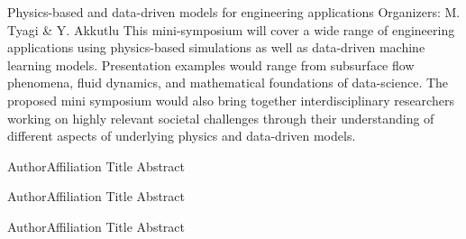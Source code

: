 \label{mini06}

\miniabs
{Physics-based and data-driven models for engineering applications}
{Organizers: M. Tyagi \& Y. Akkutlu}
{This mini-symposium will cover a wide range of engineering applications using physics-based simulations as well as data-driven machine learning models. Presentation examples would range from subsurface flow phenomena, fluid dynamics, and mathematical foundations of data-science. The proposed mini symposium would also bring together interdisciplinary researchers working on highly relevant societal challenges through their understanding of different aspects of underlying physics and data-driven models.}
\vspace{2ex}


\begin{addmargin}[2em]{0em}

\abs
{Author}{Affiliation}
{Title}
{Abstract
}

\vspace{1.5ex}

\abs
{Author}{Affiliation}
{Title}
{Abstract
}

\vspace{1.5ex}

\abs
{Author}{Affiliation}
{Title}
{Abstract
}
\end{addmargin}
